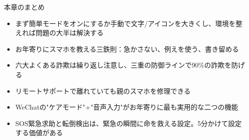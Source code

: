 \begin{tcbsummary}{本章のまとめ}
\begin{itemize}
  \item まず簡単モードをオンにするか手動で文字/アイコンを大きくし、環境を整えれば問題の大半は解決する
  \item お年寄りにスマホを教える三鉄則：急かさない、例えを使う、書き留める
  \item 六大よくある詐欺は繰り返し注意し、三重の防御ラインで90\%の詐欺を防げる
  \item リモートサポートで離れていても親のスマホを修理できる
  \item WeChatの"ケアモード"+"音声入力"がお年寄りに最も実用的な二つの機能
  \item SOS緊急求助と転倒検出は、緊急の瞬間に命を救える設定。5分かけて設定する価値がある
\end{itemize}

\end{tcbsummary}
